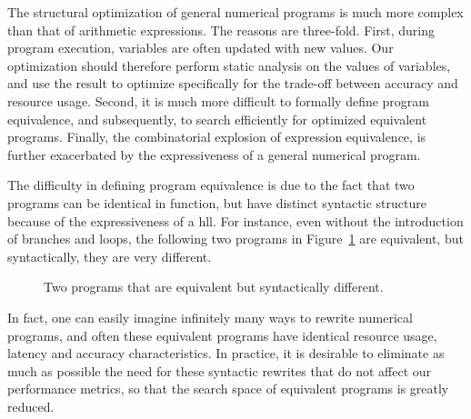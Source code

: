 The structural optimization of general numerical programs is much more complex
than that of arithmetic expressions.  The reasons are three-fold.  First,
during program execution, variables are often updated with new values.  Our
optimization should therefore perform static analysis on the values of
variables, and use the result to optimize specifically for the trade-off
between accuracy and resource usage.  Second, it is much more difficult to
formally define program equivalence, and subsequently, to search efficiently
for optimized equivalent programs.  Finally, the combinatorial explosion of
expression equivalence, is further exacerbated by the expressiveness of a
general numerical program.

The difficulty in defining program equivalence is due to the fact that
two programs can be identical in function, but have distinct syntactic
structure because of the expressiveness of a \gls{hll}\@.  For instance, even
without the introduction of branches and loops, the following two programs in
Figure~\ref{bg:fig:equiv_progs} are equivalent, but syntactically, they are
very different.
\begin{figure}[ht]
    \centering
     \qquad \qquad
    \caption{%
        Two programs that are equivalent but syntactically different.
    }\label{bg:fig:equiv_progs}
\end{figure}

In fact, one can easily imagine infinitely many ways to rewrite numerical
programs, and often these equivalent programs have identical resource usage,
latency and accuracy characteristics.  In practice, it is desirable to
eliminate as much as possible the need for these syntactic rewrites that do not
affect our performance metrics, so that the search space of equivalent programs
is greatly reduced.

